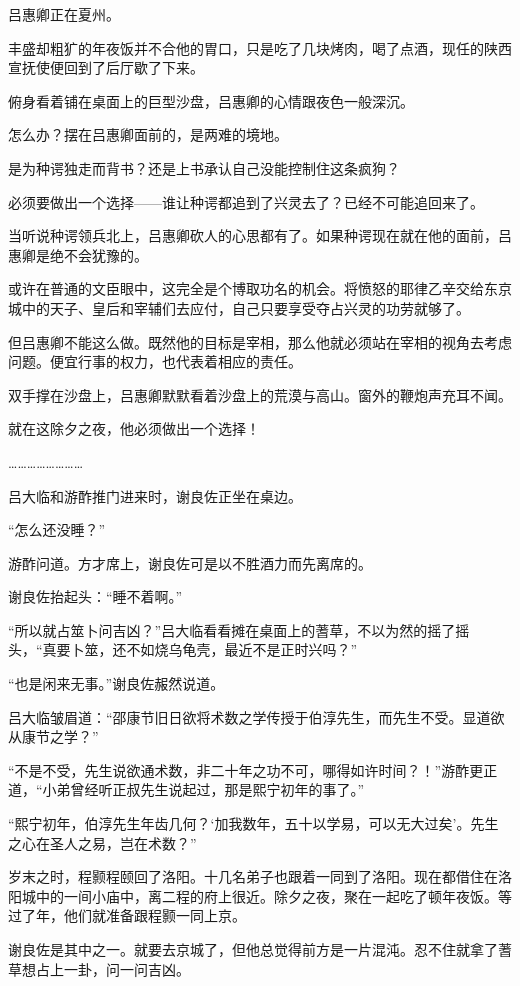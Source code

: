 吕惠卿正在夏州。

丰盛却粗犷的年夜饭并不合他的胃口，只是吃了几块烤肉，喝了点酒，现任的陕西宣抚使便回到了后厅歇了下来。

俯身看着铺在桌面上的巨型沙盘，吕惠卿的心情跟夜色一般深沉。

怎么办？摆在吕惠卿面前的，是两难的境地。

是为种谔独走而背书？还是上书承认自己没能控制住这条疯狗？

必须要做出一个选择——谁让种谔都追到了兴灵去了？已经不可能追回来了。

当听说种谔领兵北上，吕惠卿砍人的心思都有了。如果种谔现在就在他的面前，吕惠卿是绝不会犹豫的。

或许在普通的文臣眼中，这完全是个博取功名的机会。将愤怒的耶律乙辛交给东京城中的天子、皇后和宰辅们去应付，自己只要享受夺占兴灵的功劳就够了。

但吕惠卿不能这么做。既然他的目标是宰相，那么他就必须站在宰相的视角去考虑问题。便宜行事的权力，也代表着相应的责任。

双手撑在沙盘上，吕惠卿默默看着沙盘上的荒漠与高山。窗外的鞭炮声充耳不闻。

就在这除夕之夜，他必须做出一个选择！

……………………

吕大临和游酢推门进来时，谢良佐正坐在桌边。

“怎么还没睡？”

游酢问道。方才席上，谢良佐可是以不胜酒力而先离席的。

谢良佐抬起头：“睡不着啊。”

“所以就占筮卜问吉凶？”吕大临看看摊在桌面上的蓍草，不以为然的摇了摇头，“真要卜筮，还不如烧乌龟壳，最近不是正时兴吗？”

“也是闲来无事。”谢良佐赧然说道。

吕大临皱眉道：“邵康节旧日欲将术数之学传授于伯淳先生，而先生不受。显道欲从康节之学？”

“不是不受，先生说欲通术数，非二十年之功不可，哪得如许时间？！”游酢更正道，“小弟曾经听正叔先生说起过，那是熙宁初年的事了。”

“熙宁初年，伯淳先生年齿几何？‘加我数年，五十以学易，可以无大过矣’。先生之心在圣人之易，岂在术数？”

岁末之时，程颢程颐回了洛阳。十几名弟子也跟着一同到了洛阳。现在都借住在洛阳城中的一间小庙中，离二程的府上很近。除夕之夜，聚在一起吃了顿年夜饭。等过了年，他们就准备跟程颢一同上京。

谢良佐是其中之一。就要去京城了，但他总觉得前方是一片混沌。忍不住就拿了蓍草想占上一卦，问一问吉凶。

